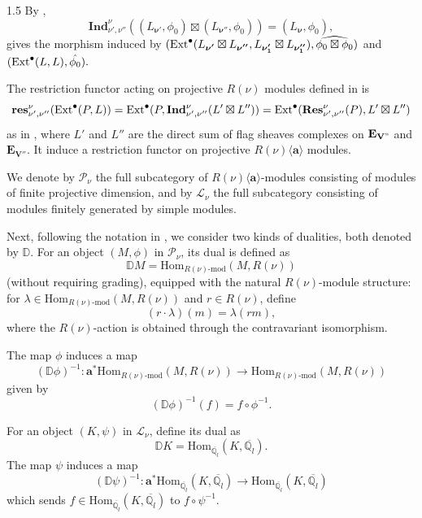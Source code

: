\documentclass[10pt]{amsart}
\def\Ext{\mbox{\rm Ext}}   \def\Ker{\mbox{\rm Ker}\,}
\def\bfV{{\mathbf V}}
\def\bfV{\mathbf{V}}
\def\bfE{\mathbf{E}}
\def\Ind{\mathbf{Ind}}
\def\Res{\mathbf{Res}}
\def\res{\mathbf{res}}
\newcommand\bbq{{\mathbb Q}}
\begin{document}
\begin{spacing}{1.5}
By \cite[Lemma 12.3.2]{lusztig2010introduction},
\begin{equation}\label{eq11}
    \Ind_{\nu',\nu''}^{\nu}((L_{\boldsymbol{\nu'}},\phi_0)\boxtimes (L_{\boldsymbol{\nu''}},\phi_0))=(L_{\boldsymbol{\nu}},\phi_0),
\end{equation}
gives the morphism induced by $(\Ext^{\bullet}(L_{\boldsymbol{\nu'}}\boxtimes L_{\boldsymbol{\nu''}},L_{\boldsymbol{\nu_1'}}\boxtimes L_{\boldsymbol{\nu_1''}}),\widehat{\phi_0\boxtimes\phi_0})$ and $(\Ext^{\bullet}(L,L),\hat{\phi_0}).$

The restriction functor acting on projective $R(\nu)$ modules defined in \cite{VaragnoloVasserot+2011+67+100} is $$\res_{\nu',\nu''}^{\nu}(\Ext^{\bullet}(P,L))=\Ext^{\bullet}(P,\Ind_{\nu',\nu''}^{\nu}(L'\boxtimes L''))=\Ext^{\bullet}(\Res_{\nu',\nu''}^{\nu}(P),L'\boxtimes L'')$$ as in \cite[Definition 7.4]{Bi2024}, where $L'$ and $L''$ are the direct sum of flag sheaves complexes on $\bfE_{\bfV"}$ and $\bfE_{\bfV''}.$
It induce a restriction functor on projective $R(\nu)\langle \mathbf{a}\rangle$ modules.

We denote by $\mathcal{P}_{\nu}$ the full subcategory of $R(\nu)\langle\mathbf{a}\rangle$-modules consisting of modules of finite projective dimension, and by $\mathcal{L}_{\nu}$ the full subcategory consisting of modules finitely generated by simple modules.

Next, following the notation in \cite{https://doi.org/10.1112/jlms.12218}, we consider two kinds of dualities, both denoted by $\mathbb{D}$. For an object $(M, \phi)$ in $\mathcal{P}_{\nu}$, its dual is defined as
\[
\mathbb{D}M = \mathrm{Hom}_{R(\nu)\text{-}\mathrm{mod}}(M, R(\nu))
\]
(without requiring grading), equipped with the natural $R(\nu)$-module structure: for $\lambda\in \mathrm{Hom}_{R(\nu)\text{-}\mathrm{mod}}(M, R(\nu))$ and $r\in R(\nu)$, define
\[
(r\cdot \lambda)(m)=\lambda(rm),
\]
where the $R(\nu)$-action is obtained through the contravariant isomorphism. 


The map $\phi$ induces a map
\[
(\mathbb{D}\phi)^{-1} : \mathbf{a}^* \mathrm{Hom}_{R(\nu)\text{-}\mathrm{mod}}(M, R(\nu)) \to \mathrm{Hom}_{R(\nu)\text{-}\mathrm{mod}}(M, R(\nu))
\]
given by
\[
(\mathbb{D}\phi)^{-1}(f) = f \circ \phi^{-1}.
\]

For an object $(K, \psi)$ in $\mathcal{L}_{\nu}$, define its dual as
\[
\mathbb{D}K = \mathrm{Hom}_{\overline{\bbq_l}}(K, {\overline{\bbq_l}}).
\]
The map $\psi$ induces a map
\[
(\mathbb{D}\psi)^{-1} : \mathbf{a}^* \mathrm{Hom}_{\overline{\bbq_l}}(K, {\overline{\bbq_l}}) \to \mathrm{Hom}_{\overline{\bbq_l}}(K, {\overline{\bbq_l}})
\]
which sends $f \in \mathrm{Hom}_{\overline{\bbq_l}}(K, {\overline{\bbq_l}})$ to $f \circ \psi^{-1}$.


\end{spacing}
\end{document}
